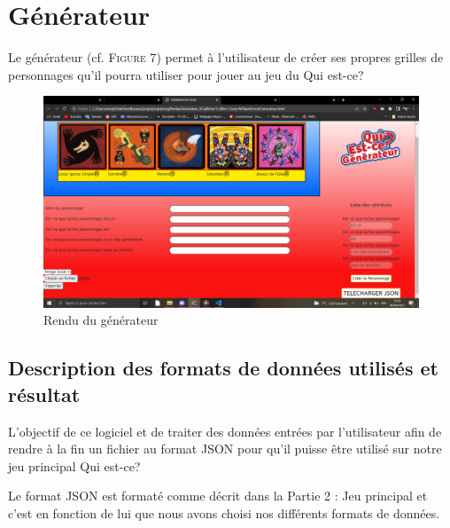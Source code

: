 \documentclass{article}
\begin{document}
    \section{Générateur}
        \vspace{0.5cm}
        Le générateur (cf. \textsc{Figure 7}) permet à l'utilisateur de créer ses propres grilles de personnages qu'il pourra utiliser pour jouer au jeu du \textsf{Qui est-ce?}
        
        \begin{figure}[h]
            \centering
            \includegraphics[width=15cm]{images/generateur.png}
            \caption{Rendu du générateur}
        \end{figure}
        
        \subsection{Description des formats de données utilisés et résultat}
            L'objectif de ce logiciel et de traiter des données entrées par l'utilisateur afin de rendre à la fin un fichier au format JSON pour qu'il puisse être utilisé sur notre jeu principal \textsf{Qui est-ce?}\\
            \par  Le format JSON est formaté comme décrit dans la Partie 2 : \textsf{Jeu principal} et c'est en fonction de lui que nous avons choisi nos différents formats de données.
            
\end{document}

